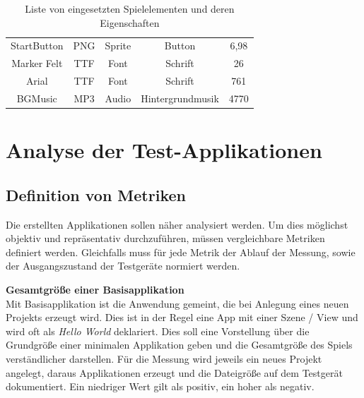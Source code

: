 \begin{table}[htbp]
{\begin{tabular}{ccccc}
			\rowcolor[HTML]{C0C0C0} 
			{\color[HTML]{000000} StartButton} & {\color[HTML]{000000} PNG}      & {\color[HTML]{000000} Sprite}        & {\color[HTML]{000000} Button}           & {\color[HTML]{000000}6,98}           \\
			{\color[HTML]{000000} Marker Felt} & {\color[HTML]{000000} TTF}      & {\color[HTML]{000000} Font}          & {\color[HTML]{000000} Schrift}          & {\color[HTML]{000000}26}           \\
			\rowcolor[HTML]{C0C0C0} 
			{\color[HTML]{000000} Arial}       & {\color[HTML]{000000} TTF}      & {\color[HTML]{000000} Font}          & {\color[HTML]{000000} Schrift}          & {\color[HTML]{000000}761}           \\
			{\color[HTML]{000000} BGMusic}     & {\color[HTML]{000000} MP3}      & {\color[HTML]{000000} Audio}         & {\color[HTML]{000000} Hintergrundmusik} & {\color[HTML]{000000}4770}          
		\end{tabular}
	}
	\caption{Liste von eingesetzten Spielelementen und deren Eigenschaften}
	\label{spiel_komponenten}
\end{table}

\chapter{Analyse der Test-Applikationen}

\section{Definition von Metriken}
Die erstellten Applikationen sollen näher analysiert werden. Um dies möglichst objektiv und repräsentativ durchzuführen, müssen vergleichbare Metriken definiert werden.
Gleichfalls muss für jede Metrik der Ablauf der Messung, sowie der Ausgangszustand der Testgeräte normiert werden.

\bigskip
\textbf{Gesamtgröße einer Basisapplikation} \\
Mit Basisapplikation ist die Anwendung gemeint, die bei Anlegung eines neuen Projekts erzeugt wird. Dies ist in der Regel eine App mit einer Szene / View und wird oft als \emph{Hello World} deklariert. Dies soll eine Vorstellung über die Grundgröße einer minimalen Applikation geben und die Gesamtgröße des Spiels verständlicher darstellen. Für die Messung wird jeweils ein neues Projekt angelegt, daraus Applikationen erzeugt und die Dateigröße auf dem Testgerät dokumentiert. Ein niedriger Wert gilt als positiv, ein hoher als negativ.

